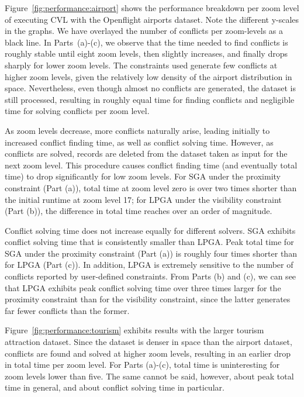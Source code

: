 Figure~\ref{fig:performance:airport} shows the performance breakdown per zoom level of executing CVL with the Openflight airports dataset. Note the different y-scales in the graphs. We have overlayed the number of conflicts per zoom-levels as a black line. In Parts~(a)-(c), we observe that the time needed to find conflicts is roughly stable until eight zoom levels, then slightly increases, and finally drops sharply for lower zoom levels. The constraints used generate few conflicts at higher zoom levels, given the relatively low density of the airport distribution in space. Nevertheless, even though almost no conflicts are generated, the dataset is still processed, resulting in roughly equal time for finding conflicts and negligible time for solving conflicts per zoom level. 
 
As zoom levels decrease, more conflicts naturally arise, leading initially to increased conflict finding time, as well as conflict solving time. However, as conflicts are solved, records are deleted from the dataset taken as input for the next zoom level. This procedure causes conflict finding time (and eventually total time) to drop significantly for low zoom levels. For SGA under the proximity constraint (Part (a)), total time at zoom level zero is over two times shorter than the initial runtime at zoom level 17; for LPGA under the visibility constraint (Part (b)), the difference in total time reaches over an order of magnitude.  

Conflict solving time does not increase equally for different solvers. SGA exhibits conflict solving time that is consistently smaller than LPGA. Peak total time for SGA under the proximity constraint (Part (a)) is roughly four times shorter than for LPGA (Part (c)). In addition, LPGA is extremely sensitive to the number of conflicts reported by user-defined constraints. From Parts (b) and (c), we can see that LPGA exhibits peak conflict solving time over three times larger for the proximity constraint than for the visibility constraint, since the latter generates far fewer conflicts than the former.

Figure~\ref{fig:performance:tourism} exhibits results with the larger tourism attraction dataset. Since the dataset is denser in space than the airport dataset, conflicts are found and solved at higher zoom levels, resulting in an earlier drop in total time per zoom level. For Parts (a)-(c), total time is uninteresting for zoom levels lower than five. The same cannot be said, however, about peak total time in general, and about conflict solving time in particular.

